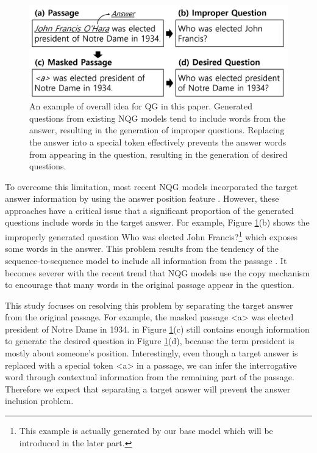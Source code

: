 \documentclass[letterpaper]{article} %
\newcommand{\kj}[1]{\textcolor{red}{#1}}
\begin{document}
\begin{figure}[t]
	\includegraphics[width = 0.48 \textwidth]{figure_1_flow2.png}
  	\caption{
    An example of overall idea for QG in this paper. Generated questions from existing NQG models tend to include words from the answer, resulting in the generation of improper questions. Replacing the answer into a special token effectively prevents the answer words from appearing in the question, resulting in the generation of desired questions.
  }

\label{fig:replace_a_token}
\end{figure}


To overcome this limitation, most recent NQG models incorporated the target answer information by using the answer position feature \cite{zhou2017neural,song2018leveraging}. However, these approaches have a critical issue that a significant proportion of the generated questions include words in the target answer. For example, Figure \ref{fig:replace_a_token}(b) shows the improperly generated question Who was elected John Francis?\footnote{This example is actually generated by our base model which will be introduced in the later part.} which exposes some words in the answer. This problem results from the tendency of the sequence-to-sequence model to include all information from the passage \cite{amplayo2018entity}. It becomes severer with the recent trend that NQG models use the copy mechanism \cite{gulcehre2016pointing} to encourage that many words in the original passage appear in the question.

This study focuses on resolving this problem by separating the target answer from the original passage. For example, the masked passage  \textless a\textgreater{} was elected president of Notre Dame in 1934. in Figure \ref{fig:replace_a_token}(c) still contains enough information to generate the desired question in Figure \ref{fig:replace_a_token}(d), because the term president is mostly about someone's position. Interestingly, even though a target answer is replaced with a special token \textless a\textgreater{} in a passage, we can infer the interrogative word through contextual information from the remaining part of the passage. Therefore we expect that separating a target answer will prevent the answer inclusion problem.
% 
%    
% 
\end{document}
